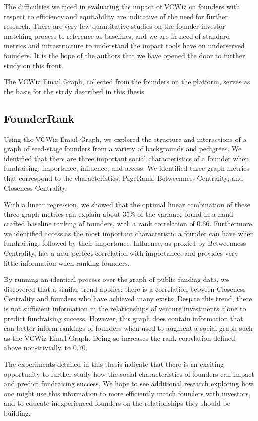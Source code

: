The difficulties we faced in evaluating the impact of VCWiz on founders with respect to efficiency and equitability are indicative of the need for further research. There are very few quantitative studies on the founder-investor matching process to reference as baselines, and we are in need of standard metrics and infrastructure to understand the impact tools have on underserved founders. It is the hope of the authors that we have opened the door to further study on this front.

The VCWiz Email Graph, collected from the founders on the platform, serves as the basis for the study described in this thesis.

\subsection{FounderRank}

Using the VCWiz Email Graph, we explored the structure and interactions of a graph of seed-stage founders from a variety of backgrounds and pedigrees. We identified that there are three important social characteristics of a founder when fundraising: importance, influence, and access. We identified three graph metrics that correspond to the characteristics: PageRank, Betweenness Centrality, and Closeness Centrality.

With a linear regression, we showed that the optimal linear combination of these three graph metrics can explain about 35\% of the variance found in a hand-crafted baseline ranking of founders, with a rank correlation of $0.66$. Furthermore, we identified access as the most important characteristic a founder can have when fundraising, followed by their importance. Influence, as proxied by Betweenness Centrality, has a near-perfect correlation with importance, and provides very little information when ranking founders.

By running an identical process over the graph of public funding data, we discovered that a similar trend applies: there is a correlation between Closeness Centrality and founders who have achieved many exists. Despite this trend, there is not sufficient information in the relationships of venture investments alone to predict fundraising success. However, this graph does contain information that can better inform rankings of founders when used to augment a social graph such as the VCWiz Email Graph. Doing so increases the rank correlation defined above non-trivially, to $0.70$.

The experiments detailed in this thesis indicate that there is an exciting opportunity to further study how the social characteristics of founders can impact and predict fundraising success. We hope to see additional research exploring how one might use this information to more efficiently match founders with investors, and to educate inexperienced founders on the relationships they should be building.

